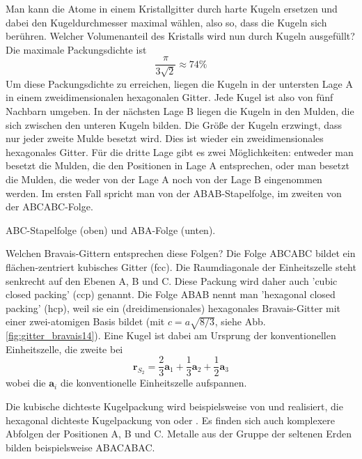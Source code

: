 Man kann die Atome in einem Kristallgitter durch harte Kugeln ersetzen und dabei den Kugeldurchmesser maximal wählen, also so, dass die Kugeln sich berühren. Welcher Volumenanteil des Kristalls wird nun durch Kugeln ausgefüllt? Die maximale Packungsdichte ist 
\begin{equation}
 \frac{\pi}{3 \sqrt{2}} \approx 74 \%
\end{equation}
Um diese Packungsdichte zu erreichen, liegen die Kugeln in der untersten Lage A in einem zweidimensionalen hexagonalen Gitter. Jede Kugel ist also von fünf Nachbarn umgeben. In der nächsten Lage B liegen die Kugeln in den Mulden, die sich zwischen den unteren Kugeln bilden.  Die Größe der Kugeln erzwingt, dass nur jeder zweite Mulde besetzt wird.
Dies ist wieder ein zweidimensionales hexagonales Gitter. Für die dritte Lage gibt es zwei Möglichkeiten: entweder man besetzt die Mulden, die den Positionen in Lage A entsprechen, oder man besetzt die Mulden, die weder von der Lage A noch von der Lage B eingenommen werden. Im ersten Fall spricht man von der ABAB-Stapelfolge, im zweiten von der ABCABC-Folge.

\begin{marginfigure}

\caption{ABC-Stapelfolge (oben) und ABA-Folge (unten).}
\end{marginfigure}


Welchen Bravais-Gittern entsprechen diese Folgen?  Die Folge ABCABC bildet ein flächen-zentriert kubisches Gitter (fcc).  Die Raumdiagonale der  Einheitszelle steht senkrecht auf den Ebenen A, B und C. Diese Packung wird daher auch 'cubic closed packing' (ccp) genannt. Die Folge ABAB nennt man  'hexagonal closed packing' (hcp), weil sie ein (dreidimensionales) hexagonales Bravais-Gitter mit einer zwei-atomigen Basis bildet (mit $c=a \sqrt{8/3}$, siehe Abb. \ref{fig:gitter_bravais14}). Eine Kugel ist dabei am Ursprung der konventionellen Einheitszelle, die zweite bei 
\begin{equation}
 \mathbf{r}_{S_2} =  \frac{2}{3}  \mathbf{a}_1 + \frac{1}{3}  \mathbf{a}_2 + \frac{1}{2}  \mathbf{a}_3  
\end{equation}
 wobei die $\mathbf{a}_i$ die konventionelle Einheitszelle aufspannen.

Die kubische dichteste Kugelpackung wird beispielsweise von  und  realisiert, die hexagonal dichteste Kugelpackung von  oder . Es finden sich auch komplexere Abfolgen der Positionen A, B und C. Metalle aus der Gruppe der seltenen Erden bilden beispielsweise ABACABAC.






